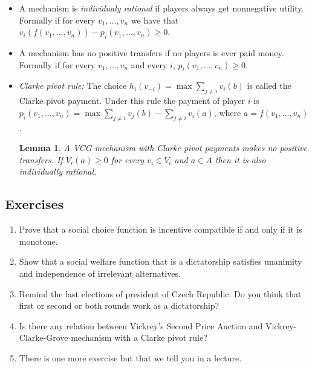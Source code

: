 \documentclass{article}
\newtheorem{theorem}{Theorem}
\newtheorem{lemma}{Lemma}
\theoremstyle{definition}
\begin{document}
\begin{itemize}
\begin{theorem}[Vickrey-Clarke-Grove]
Every VCG mechanism is incentive compatible.
\end{theorem}

\item A mechanism is \emph{individualy rational} if players always get nonnegative utility.
Formally if for every $v_1, \ldots, v_n$ we have that $v_i(f(v_1, \ldots, v_n)) - p_i(v_1, \ldots, v_n) \geq 0$.

\item A mechanism has no positive transfers if no players is ever paid money. Formally if for every $v_1, \ldots, v_n$
and every $i$, $p_i(v_1, \ldots, v_n) \geq 0$.

\item \emph{Clarke pivot rule:} The choice $h_i(v_{-i}) = \max \sum_{j \neq i} v_i(b)$ is called the Clarke pivot
payment. Under this rule the payment of player $i$ is $p_i(v_1, \ldots, v_n) = \max \sum_{j \neq i} v_j(b)
- \sum_{j \neq i} v_i(a)$, where $a = f(v_1, \ldots, v_n)$.

\begin{lemma}
A VCG mechanism with Clarke pivot payments makes no positive transfers. If $V_i(a) \geq 0$ for every $v_i \in V_i$
and $a \in A$ then it is also individually rational.
\end{lemma}

\end{itemize}

\subsection{Exercises}
\begin{enumerate}

\item Prove that a social choice function is incentive compatible if and only if it is monotone.

\item Show that a social welfare function that is a dictatorship satisfies
unanimity and independence of irrelevant alternatives.

\item Remind the last elections of president of Czech Republic. Do you think that first or second
or both rounds work as a dictatorship?

\item Is there any relation between Vickrey's Second Price Auction and Vickrey-Clarke-Grove mechanism
with a Clarke pivot rule?

\item There is one more exercise but that we tell you in a lecture.

\end{enumerate}
\end{document}
